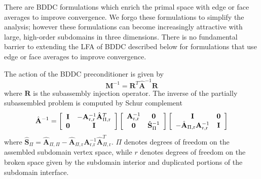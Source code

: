 \documentclass[review]{siamart190516}
\begin{document}
There are BDDC formulations which enrich the primal space with edge or face averages to improve convergence.
We forgo these formulations to simplify the analysis; however these formulations can become increasingly attractive with large, high-order subdomains in three dimensions.
There is no fundamental barrier to extending the LFA of BDDC described below for formulations that use edge or face averages to improve convergence.

\begin{definition}\label{def:bddcpreconditioner}
The action of the BDDC preconditioner is given by
\begin{equation}
\mathbf{M}^{-1} = \mathbf{R}^T \hat{\mathbf{A}}^{-1} \mathbf{R}
\end{equation}
where $\mathbf{R}$ is the subassembly injection operator.
The inverse of the partially subassembled problem is computed by Schur complement
\begin{equation}
\hat{\mathbf{A}}^{-1} =
\left[ \begin{array}{c c}
\mathbf{I}  &  -\mathbf{A}_{\text{r}, \text{r}}^{-1} \hat{\mathbf{A}}_{\Pi, \text{r}}^T  \\
\mathbf{0}  &  \mathbf{I}                                                                \\
\end{array} \right]
\left[ \begin{array}{c c}
\mathbf{A}_{\text{r}, \text{r}}^{-1}  &  \mathbf{0}                   \\
\mathbf{0}                            &  \hat{\mathbf{S}}_{\Pi}^{-1}  \\
\end{array} \right]
\left[ \begin{array}{c c}
\mathbf{I}                                                              &  \mathbf{0}  \\
-\hat{\mathbf{A}}_{\Pi, \text{r}} \mathbf{A}_{\text{r}, \text{r}}^{-1}  &  \mathbf{I}  \\
\end{array} \right]
\end{equation}
where $\hat{\mathbf{S}}_{\Pi} = \hat{\mathbf{A}}_{\Pi, \Pi} - \hat{\mathbf{A}}_{\Pi, \text{r}} \mathbf{A}_{\text{r}, \text{r}}^{-1} \hat{\mathbf{A}}_{\Pi, \text{r}}^T$.
$\Pi$ denotes degrees of freedom on the assembled subdomain vertex space, while $r$ denotes degrees of freedom on the broken space given by the subdomain interior and duplicated portions of the subdomain interface.
\end{definition}
\end{document}
